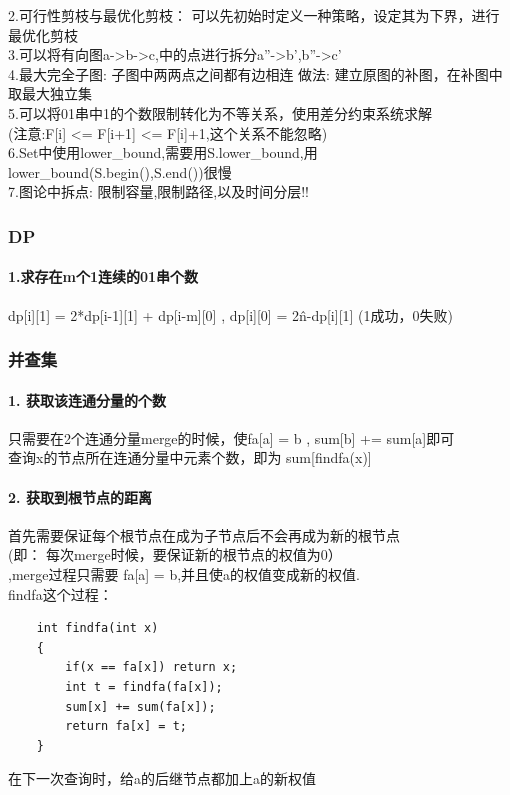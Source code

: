 \documentclass{article}
\begin{document}
2.可行性剪枝与最优化剪枝： 可以先初始时定义一种策略，设定其为下界，进行最优化剪枝 \\

3.可以将有向图a->b->c,中的点进行拆分a''->b',b''->c'　\\

4.最大完全子图: 子图中两两点之间都有边相连  做法: 建立原图的补图，在补图中取最大独立集 \\

5.可以将01串中1的个数限制转化为不等关系，使用差分约束系统求解 \\ (注意:F[i] <= F[i+1] <= F[i]+1,这个关系不能忽略) \\

6.Set中使用lower\_bound,需要用S.lower\_bound,用lower\_bound(S.begin(),S.end())很慢 \\

7.图论中拆点: 限制容量,限制路径,以及时间分层!!\\

\subsubsection{DP}
\paragraph{1.求存在m个1连续的01串个数\\}
  dp[i][1] = 2*dp[i-1][1] + dp[i-m][0] , dp[i][0] = 2\^n-dp[i][1] (1成功，0失败)\\
\subsubsection{并查集}
\paragraph{1. 获取该连通分量的个数\\}
只需要在2个连通分量merge的时候，使fa[a] = b , sum[b] += sum[a]即可\\
查询x的节点所在连通分量中元素个数，即为 sum[findfa(x)] \\

\paragraph{2. 获取到根节点的距离\\}
首先需要保证每个根节点在成为子节点后不会再成为新的根节点\\
(即： 每次merge时候，要保证新的根节点的权值为0） \\ ,merge过程只需要 fa[a] = b,并且使a的权值变成新的权值.\\ 
findfa这个过程：\\
\begin{lstlisting}
	int findfa(int x)
	{
		if(x == fa[x]) return x;
		int t = findfa(fa[x]);
		sum[x] += sum(fa[x]);
		return fa[x] = t;
	}
\end{lstlisting}
在下一次查询时，给a的后继节点都加上a的新权值\\
\end{document}
